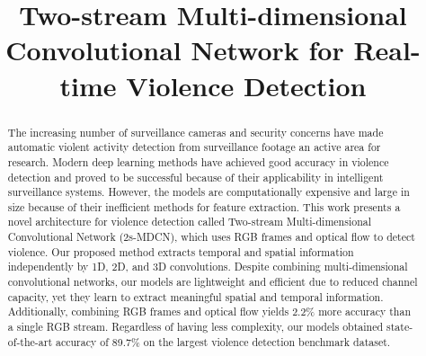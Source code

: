 \documentclass[conference]{IEEEtran}
\begin{document}

\title{Two-stream Multi-dimensional Convolutional Network for Real-time Violence Detection}

\author{
}

\maketitle
\thispagestyle{plain}
\pagestyle{plain}





\begin{abstract}
The increasing number of surveillance cameras and security concerns have made automatic violent activity detection from surveillance footage an active area for research. 
Modern deep learning methods have achieved good accuracy in violence detection and proved to be successful because of their applicability in intelligent surveillance systems.
However, the models are computationally expensive and large in size because of their inefficient methods for feature extraction.
This work presents a novel architecture for violence detection called Two-stream Multi-dimensional Convolutional Network (2s-MDCN), which uses RGB frames and optical flow to detect violence. 
Our proposed method extracts temporal and spatial information independently by 1D, 2D, and 3D convolutions. 
Despite combining multi-dimensional convolutional networks, our models are lightweight and efficient due to reduced channel capacity, yet they learn to extract meaningful spatial and temporal information.
Additionally, combining RGB frames and optical flow yields 2.2\% more accuracy than a single RGB stream.
Regardless of having less complexity, our models obtained state-of-the-art accuracy of 89.7$\%$ on the largest violence detection benchmark dataset. 

\end{abstract}
\end{document}
